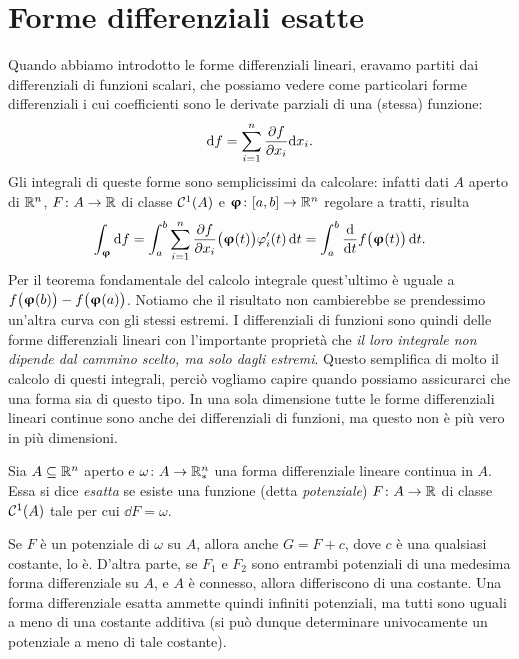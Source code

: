 \section{Forme differenziali esatte}
Quando abbiamo introdotto le forme differenziali lineari, eravamo partiti dai differenziali di funzioni scalari, che possiamo vedere come particolari forme differenziali i cui coefficienti sono le derivate parziali di una (stessa) funzione:
\begin{equation}
	\textup{d} f=\sum_{i=1}^n\frac{\partial {f}}{\partial {x_i}}\textup{d} x_i.
\end{equation}
Gli integrali di queste forme sono semplicissimi da calcolare: infatti dati $A$ aperto di $\mathbb{R}^n$, $F\colon A\to\mathbb{R}$ di classe $\mathcal{C}^{{1}}(A)$ e $\bm{\upvarphi}\colon[a,b]\to\mathbb{R}^n$ regolare a tratti, risulta
\begin{equation}
	\int_{\bm{\upvarphi}}\textup{d} f=\int_a^b\sum_{i=1}^n\frac{\partial {f}}{\partial {x_i}}\big(\bm{\upvarphi}(t)\big)\varphi_i'(t)\,\textup{d} t=\int_a^b\frac{\textup{d} {}}{\textup{d} {t}}f\big(\bm{\upvarphi}(t)\big)\,\textup{d} t.
\end{equation}
Per il teorema fondamentale del calcolo integrale quest'ultimo è uguale a $f\big(\bm{\upvarphi}(b)\big)-f\big(\bm{\upvarphi}(a)\big)$.
Notiamo che il risultato non cambierebbe se prendessimo un'altra curva con gli stessi estremi.
I differenziali di funzioni sono quindi delle forme differenziali lineari con l'importante proprietà che \emph{il loro integrale non dipende dal cammino scelto, ma solo dagli estremi}.
Questo semplifica di molto il calcolo di questi integrali, perciò vogliamo capire quando possiamo assicurarci che una forma sia di questo tipo.
In una sola dimensione tutte le forme differenziali lineari continue sono anche dei differenziali di funzioni, ma questo non è più vero in più dimensioni.
\begin{definizione} \label{d:forma-differenziale-esatta}
	Sia $A\subseteq\mathbb{R}^n$ aperto e $\omega\colon A\to\mathbb{R}^n_*$ una forma differenziale lineare continua in $A$.
	Essa si dice \emph{esatta} se esiste una funzione (detta \emph{potenziale}) $F\colon A\to\mathbb{R}$ di classe $\mathcal{C}^{{1}}(A)$ tale per cui $\dd F=\omega$.
\end{definizione}
\begin{osservazione}
	Se $F$ è un potenziale di $\omega$ su $A$, allora anche $G=F+c$, dove $c$ è una qualsiasi costante, lo è.
	D'altra parte, se $F_1$ e $F_2$ sono entrambi potenziali di una medesima forma differenziale su $A$, e $A$ è connesso, allora differiscono di una costante.%
	Una forma differenziale esatta ammette quindi infiniti potenziali, ma tutti sono uguali a meno di una costante additiva (si può dunque determinare univocamente un potenziale a meno di tale costante).
\end{osservazione}
